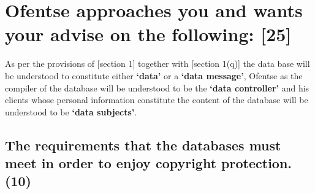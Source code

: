 \documentclass[11pt]{article}
\begin{document}
\section{Ofentse approaches you and wants your advise on the following: [25]}
\label{sec:org39b03a2}

As per the provisions of [section 1]\cite{rsa02_elect_comm_trans_act} together
with [section 1(q)]\cite{rsa12_elect_comm_trans_amend_bill} the data base will be
understood to constitute either \textbf{`data'} or a \textbf{`data message'}, Ofentse as
the compiler of the database will be understood to be the \textbf{`data controller'}
and his clients whose personal information constitute the content of the
database will be understood to be \textbf{`data subjects'}.

\subsection{The requirements that the databases must meet in order to enjoy copyright protection. (10)}
\label{sec:org2204aed}
\end{document}

